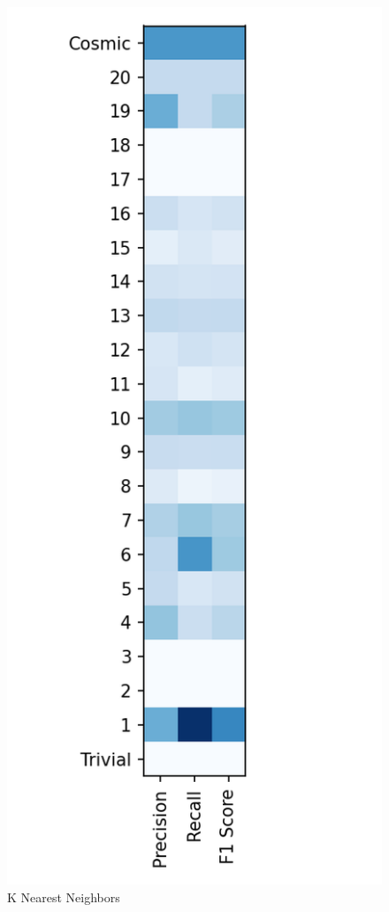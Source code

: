 \documentclass{article}
\begin{document}
\begin{figure}[ht]
\begin{minipage}[b]{0.32\linewidth}
			\caption*{K Nearest Neighbors} 
			\vspace{10ex}
		\end{minipage} \hfill
		\begin{minipage}[b]{0.32\linewidth}
			\centering
			\includegraphics[width=\linewidth]{22 - Logistic Regression.png} 

\end{minipage}
\end{figure}
\end{document}

